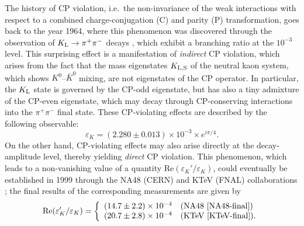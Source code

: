 \documentclass[12pt]{article}
\begin{document}
The history of CP violation, i.e.\ the non-invariance of the weak interactions
with respect to a combined charge-conjugation (C) and parity (P) 
transformation, goes back to the year 1964, where this phenomenon was
discovered through the observation of $K_{\rm L}\to\pi^+\pi^-$ decays
\cite{CP-obs}, which exhibit a branching ratio at the $10^{-3}$ level. This 
surprising effect is a manifestation of {\it indirect} CP violation, which arises 
from the fact that the mass eigenstates $K_{\rm L,S}$ of the neutral kaon 
system, which shows $K^0$--$\bar K^0$ mixing, are not eigenstates of the 
CP operator. In particular, the $K_{\rm L}$ state is governed by the CP-odd 
eigenstate, but has also a tiny admixture of the CP-even eigenstate, which 
may decay through CP-conserving interactions into the $\pi^+\pi^-$ final state. 
These CP-violating effects are described by the following observable:
\begin{equation}\label{epsK}
\varepsilon_K=(2.280\pm0.013)\times10^{-3}\times e^{i\pi/4}.
\end{equation}
On the other hand, CP-violating effects may also arise directly at the decay-amplitude
level, thereby yielding {\it direct} CP violation. This phenomenon, which leads to a
non-vanishing value of a quantity Re$(\varepsilon_K'/\varepsilon_K)$, could 
eventually be established in 1999 through the NA48 (CERN) and KTeV 
(FNAL) collaborations \cite{eps-prime}; the final results of the corresponding 
measurements are given by
\begin{equation}\label{epsp-eps-final}
\mbox{Re}(\varepsilon_K'/\varepsilon_K)=\left\{\begin{array}{ll}
(14.7\pm2.2)\times10^{-4}&\mbox{(NA48 \cite{NA48-final})}\\
(20.7\pm2.8)\times10^{-4}&\mbox{(KTeV \cite{KTeV-final}).}
\end{array}
\right.
\end{equation}
\end{document}

